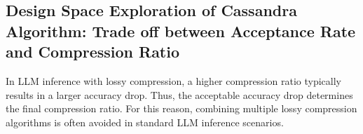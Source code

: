 







\subsection{Design Space Exploration of Cassandra Algorithm: Trade off between Acceptance Rate and Compression Ratio}
\label{section_4_3}
In LLM inference with lossy compression, a higher compression ratio typically results in a larger accuracy drop. Thus, the acceptable accuracy drop determines the final compression ratio. For this reason, combining multiple lossy compression algorithms is often avoided in standard LLM inference scenarios.

